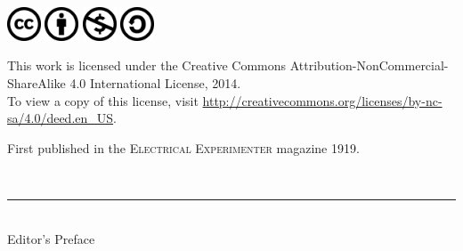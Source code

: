 \documentclass[a4paper,12pt,english,twoside,openright]{memoir}
\begin{document}
	\newpage
	\thispagestyle{empty}
	{
	\centering\normalsize
	
	\includegraphics[width=1cm]{cc-large.png}\hspace{1em}
	\includegraphics[width=1cm]{by-large.png}\hspace{1em}
	\includegraphics[width=1cm]{nc-large.png}\hspace{1em}
	\includegraphics[width=1cm]{sa-large.png}
	
	\bigskip
	
	This work is licensed under the Creative Commons Attribution-NonCommercial-ShareAlike 4.0 International License, 2014. \\
	To view a copy of this license, visit \url{http://creativecommons.org/licenses/by-nc-sa/4.0/deed.en_US}.
	
	\bigskip
	
	{\small First published in the \textsc{Electrical Experimenter} magazine 1919.} 
	\par	
	}
	

\newpage
\clearforchapter	

\tableofcontents*
\newpage
\clearforchapter	

\thispagestyle{empty}
\markright{}
\vspace*{5em}
\begin{center}
	\bfseries
	\\
	\noindent\rule{.5\linewidth}{1pt}\\
	\medskip
	{\noindent\LARGE Editor's Preface}
		\par
	
	\vspace*{5em}
\end{center}
\end{document}
